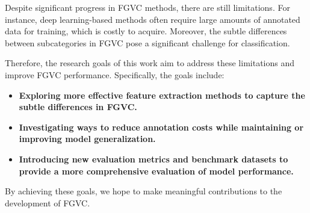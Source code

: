 Despite significant progress in FGVC methods, there are still limitations. For instance, deep learning-based methods often require large amounts of annotated data for training, which is costly to acquire. Moreover, the subtle differences between subcategories in FGVC pose a significant challenge for classification.

Therefore, the research goals of this work aim to address these limitations and improve FGVC performance. Specifically, the goals include:
\begin{itemize}
    \item \textbf{Exploring more effective feature extraction methods to capture the subtle differences in FGVC.}
    \item \textbf{Investigating ways to reduce annotation costs while maintaining or improving model generalization.}
    \item \textbf{Introducing new evaluation metrics and benchmark datasets to provide a more comprehensive evaluation of model performance.}
\end{itemize}
By achieving these goals, we hope to make meaningful contributions to the development of FGVC.
